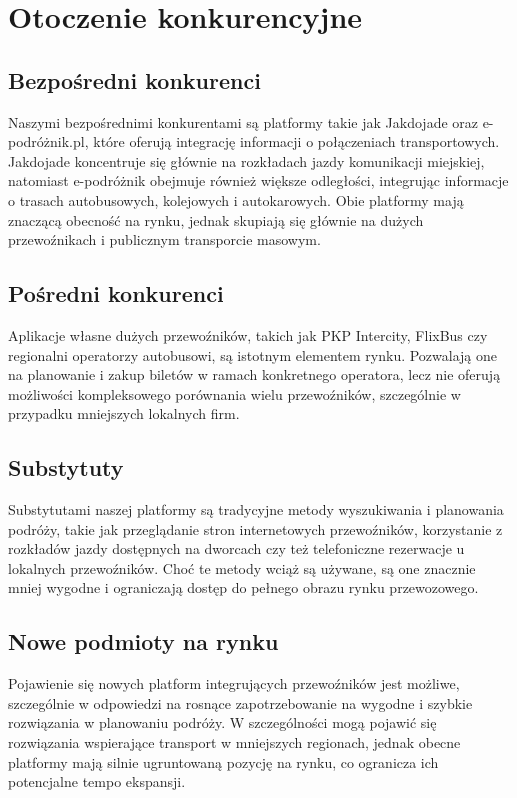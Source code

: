     
\section{Otoczenie konkurencyjne}

    \subsection{Bezpośredni konkurenci}
    Naszymi bezpośrednimi konkurentami są platformy takie jak Jakdojade oraz e-podróżnik.pl, które oferują integrację informacji o połączeniach transportowych. Jakdojade koncentruje się głównie na rozkładach jazdy komunikacji miejskiej, natomiast e-podróżnik obejmuje również większe odległości, integrując informacje o trasach autobusowych, kolejowych i autokarowych. Obie platformy mają znaczącą obecność na rynku, jednak skupiają się głównie na dużych przewoźnikach i publicznym transporcie masowym.

    \subsection{Pośredni konkurenci}
    Aplikacje własne dużych przewoźników, takich jak PKP Intercity, FlixBus czy regionalni operatorzy autobusowi, są istotnym elementem rynku. Pozwalają one na planowanie i zakup biletów w ramach konkretnego operatora, lecz nie oferują możliwości kompleksowego porównania wielu przewoźników, szczególnie w przypadku mniejszych lokalnych firm.

    \subsection{Substytuty}
    Substytutami naszej platformy są tradycyjne metody wyszukiwania i planowania podróży, takie jak przeglądanie stron internetowych przewoźników, korzystanie z rozkładów jazdy dostępnych na dworcach czy też telefoniczne rezerwacje u lokalnych przewoźników. Choć te metody wciąż są używane, są one znacznie mniej wygodne i ograniczają dostęp do pełnego obrazu rynku przewozowego.

    \subsection{Nowe podmioty na rynku}
    Pojawienie się nowych platform integrujących przewoźników jest możliwe, szczególnie w odpowiedzi na rosnące zapotrzebowanie na wygodne i szybkie rozwiązania w planowaniu podróży. W szczególności mogą pojawić się rozwiązania wspierające transport w mniejszych regionach, jednak obecne platformy mają silnie ugruntowaną pozycję na rynku, co ogranicza ich potencjalne tempo ekspansji.

